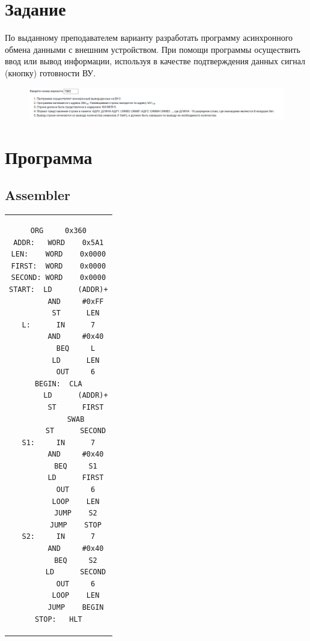 \usepackage{booktabs}%


\section{Задание}
По выданному преподавателем варианту разработать программу асинхронного обмена данными с внешним устройством. При помощи
программы осуществить ввод или вывод информации, используя в качестве подтверждения данных сигнал (кнопку) готовности ВУ.


\begin{figure}[H]
    \centering
    \includegraphics[scale=0.35]{img/variant}
\end{figure}


\section{Программа}

\subsection{Assembler}

\begin{center}
    \begin{tabular}{c}
        \begin{lstlisting}[basicstyle=\ttfamily]
        ORG     0x360
ADDR:	WORD	0x5A1
LEN:	WORD	0x0000
FIRST:	WORD	0x0000
SECOND: WORD    0x0000
START:  LD      (ADDR)+
        AND     #0xFF
        ST      LEN
L:      IN      7
        AND     #0x40
        BEQ     L
        LD      LEN
        OUT     6
BEGIN:	CLA
        LD      (ADDR)+
        ST      FIRST
        SWAB
        ST      SECOND
S1:     IN      7
        AND     #0x40
        BEQ     S1
        LD      FIRST
        OUT     6
        LOOP    LEN
        JUMP    S2
        JUMP    STOP
S2:     IN      7
        AND     #0x40
        BEQ     S2
        LD      SECOND
        OUT     6
        LOOP    LEN
        JUMP    BEGIN
STOP:	HLT

        \end{lstlisting}
    \end{tabular}
\end{center}

\newpage

